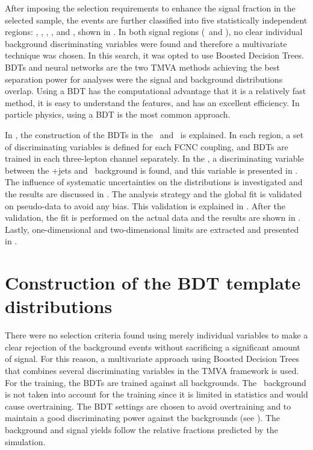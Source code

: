 After imposing the selection requirements  to enhance the signal fraction in the selected sample, the events are further classified into five statistically independent regions: \STSR, \TTSR, \WZCR, \STCR, and \TTCR, shown in . In both signal regions (\STSR\ and \TTSR), no clear individual background discriminating variables were found and therefore a multivariate technique was chosen. In this search, it was opted to use Boosted Decision Trees. BDTs and neural networks are the two TMVA methods achieving the best separation power for analyses were the signal and background distributions overlap. Using a BDT has the computational advantage that it is a relatively fast method, it is easy to understand the features,  and has an excellent efficiency. In particle physics, using a  BDT is the most common approach. 

In , the construction of the BDTs in the \STSR\ and \TTSR\ is explained. In each region, a set of discriminating variables is defined for each FCNC coupling, and BDTs are trained in each three-lepton channel separately. In the \WZCR, a discriminating variable between the \WZ+jets and \NPL\ background is found, and this variable is presented in . The influence of systematic uncertainties on the distributions is investigated and the results are discussed in . The analysis strategy and the global fit is validated on pseudo-data to avoid any bias. This validation is explained in . After the validation, the fit is performed on the actual data and the results are shown in . Lastly, one-dimensional and two-dimensional limits are extracted and presented in .


\section{Construction of the BDT template distributions}
\label{sec:templates}
There were no selection criteria found using merely individual variables to make a clear rejection of the background events without sacrificing a significant amount of signal. For this reason, a multivariate approach using Boosted Decision Trees that combines several discriminating variables in the TMVA framework is used. For the training, the BDTs are trained against all backgrounds.  The \NPL\ background is not taken into account for the training since it is limited in statistics and would cause overtraining. The BDT settings are chosen to avoid overtraining and to maintain a good discriminating power against the backgrounds (see ). The background and signal yields follow the relative fractions predicted by the simulation. 

